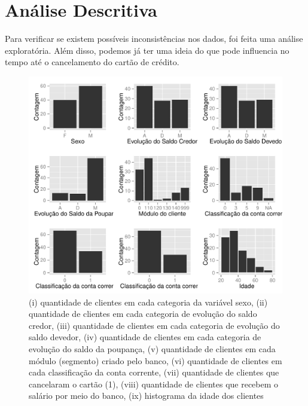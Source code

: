 \documentclass{article}\usepackage[]{graphicx}\usepackage[]{color}
\makeatletter
\def\maxwidth{ %
  \ifdim\Gin@nat@width>\linewidth
    \linewidth
  \else
    \Gin@nat@width
  \fi
}
\newenvironment{knitrout}{}{} %
\makeatother
\begin{document}
\section{Análise Descritiva}



Para verificar se existem possíveis inconsistências nos dados, foi feita uma análise exploratória. Além disso, podemos já ter uma ideia do que pode influencia no tempo até o cancelamento do cartão de crédito. 

\begin{figure}
\centering
\begin{knitrout}
\color{fgcolor}
\includegraphics[width=\maxwidth]{figure/unnamed-chunk-2} 

\end{knitrout}
\caption{(i) quantidade de clientes em cada categoria da variável sexo, (ii) quantidade de clientes em cada categoria de evolução do saldo credor, (iii) quantidade de clientes em cada categoria de evolução do saldo devedor, (iv) quantidade de clientes em cada categoria de evolução do saldo da poupança, (v) quantidade de clientes em cada módulo (segmento) criado pelo banco, (vi) quantidade de clientes em  cada classificação da conta corrente, (vii) quantidade de clientes que cancelaram o cartão (1), (viii) quantidade de clientes que recebem o salário por meio do banco, (ix) histograma da idade dos clientes}
\end{figure}
\end{document}
